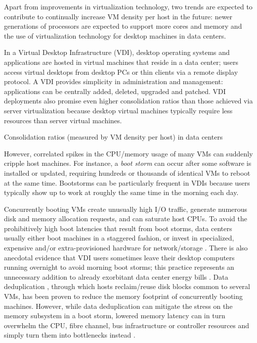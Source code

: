 Apart from improvements in virtualization technology, two trends 
are expected to contribute to continually increase
VM density per host in the future:
newer generations of processors are expected to support more cores and 
memory \cite{hansen2010lithium} and the use of virtualization technology
for desktop machines \cite{vmwarevdi} in data centers.

In a Virtual Desktop Infrastructure \cite{vmwarevdi} (VDI), 
desktop operating systems and applications are hosted in 
virtual machines that reside in a data center; 
users access virtual desktops from desktop PCs or thin clients
via a remote display protocol. A VDI provides simplicity 
in administration and management: applications
can be centrally added, deleted, upgraded and patched. 
VDI deployments also promise even
higher consolidation ratios than those achieved via server virtualization
because desktop virtual machines typically require
less resources than server virtual machines.

Consolidation ratios (measured by VM density per host) in data centers



However, correlated spikes in the CPU/memory usage of many VMs can suddenly 
cripple host machines. For instance, a \emph{boot storm} \cite{hansen2010lithium, 
liao2011vmstore, meng2010tide, rajan2010vdc, vaghani2010virtual}
can occur after some software is installed or updated, requiring hundreds 
or thousands of identical VMs to reboot at the same time.
Bootstorms can be particularly frequent in VDIs because 
users typically show up to work at roughly the same time
in the morning each day. 

Concurrently booting VMs create unusually high I/O traffic,
generate numerous disk and memory allocation requests,
and can saturate host CPUs. 
To avoid the prohibitively high boot latencies that  
result from boot storms, data centers usually either 
boot machines in a staggered fashion, or invest in specialized,
expensive and/or extra-provisioned hardware for network/storage \cite{highperfnas, liao2011vmstore}.
There is also anecdotal evidence that VDI users sometimes leave their desktop computers running
overnight to avoid morning boot storms; this practice
represents an unnecessary addition to already exorbitant
data center energy bills \cite{qureshi2009bills}. Data deduplication \cite{clements2009deduplication},
through which hosts reclaim/reuse disk blocks common to several VMs, 
has been proven to reduce the memory footprint of concurrently
booting machines. However, while data deduplication can mitigate the stress on the memory subsystem in
a boot storm, lowered memory latency can in turn overwhelm the CPU, 
fibre channel, bus infrastructure or controller resources 
and simply turn them into bottlenecks instead \cite{netappstorm}. 

